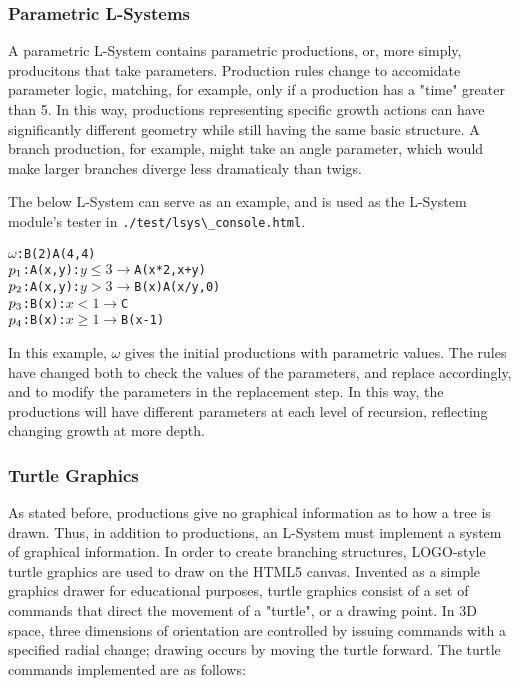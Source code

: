 \documentclass{article}
\newcommand{\tab}{\hspace*{2em}}
\begin{document}
            \subsubsection{Parametric L-Systems}
    \tab A parametric L-System contains parametric productions, or, more simply, producitons that
take parameters. Production rules change to accomidate parameter logic, matching, for example, only
if a production has a "time" greater than 5. In this way, productions representing specific growth
actions can have significantly different geometry while still having the same basic structure. A
branch production, for example, might take an angle parameter, which would make larger branches
diverge less dramaticaly than twigs.

    \tab The below L-System can serve as an example, and is used as the L-System module's tester in
\verb|./test/lsys\_console.html|.
    \begin{alltt}
    \(\omega\)  : B(2)A(4,4)
    \(p\sb{1}\) : A(x,y) : \(y \leq 3 \rightarrow\) A(x*2, x+y)
    \(p\sb{2}\) : A(x,y) : \(y > 3 \rightarrow\) B(x)A(x/y, 0)
    \(p\sb{3}\) : B(x)   : \(x < 1  \rightarrow\) C
    \(p\sb{4}\) : B(x)   : \(x \geq 1 \rightarrow\) B(x-1)   
    \end{alltt}
In this example, $\omega$ gives the initial productions with parametric values. The rules have
changed both to check the values of the parameters, and replace accordingly, and to modify the
parameters in the replacement step. In this way, the productions will have different parameters at
each level of recursion, reflecting changing growth at more depth.

            \subsubsection{Turtle Graphics}
    \tab As stated before, productions give no graphical information as to how a tree is drawn.
Thus, in addition to productions, an L-System must implement a system of graphical information. In
order to create branching structures, LOGO-style turtle graphics are used to draw on the HTML5
canvas. Invented as a simple graphics drawer for educational purposes, turtle graphics consist of a
set of commands that direct the movement of a "turtle", or a drawing point. In 3D space, three
dimensions of orientation are controlled by issuing commands with a specified radial change;
drawing occurs by moving the turtle forward. The turtle commands implemented are as follows:
\end{document}
